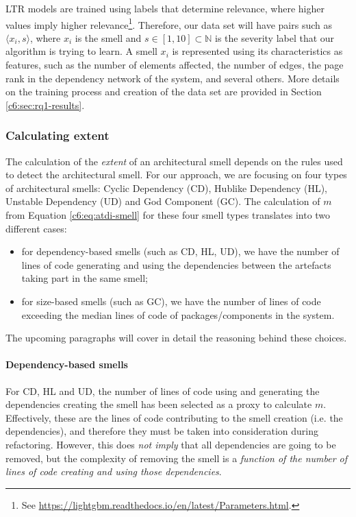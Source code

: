 LTR models are trained using labels that determine relevance, where higher values imply higher relevance\footnote{See \url{https://lightgbm.readthedocs.io/en/latest/Parameters.html}.}. 
Therefore, our data set will have pairs such as $\langle x_i, s \rangle$, where $x_i$ is the smell and $s\in [1, 10] \subset \mathbb{N}$ is the severity label that our algorithm is trying to learn.
A smell $x_i$ is represented using its characteristics as features, such as the number of elements affected, the number of edges, the page rank in the dependency network of the system, and several others. More details on the training process and creation of the data set are provided in Section \ref{c6:sec:rq1-results}.

\subsubsection{Calculating extent}\label{c6:sec:calculating-extent}
The calculation of the \emph{extent} of an architectural smell depends on the rules used to detect the architectural smell.
For our approach, we are focusing on four types of architectural smells: Cyclic Dependency (CD), Hublike Dependency (HL), Unstable Dependency (UD) and God Component (GC).
The calculation of $m$ from Equation \ref{c6:eq:atdi-smell} for these four smell types translates into two different cases:
\begin{itemize}
    \item for dependency-based smells (such as CD, HL, UD), we have the number of lines of code generating and using the dependencies between the artefacts taking part in the same smell;
    \item for size-based smells (such as GC), we have the number of lines of code exceeding the median lines of code of packages/components in the system.
\end{itemize}
The upcoming paragraphs will cover in detail the reasoning behind these choices.

\paragraph{Dependency-based smells}
For CD, HL and UD, the number of lines of code using and generating the dependencies creating the smell has been selected as a proxy to calculate $m$.
Effectively, these are the lines of code contributing to the smell creation (i.e. the dependencies), and therefore they must be taken into consideration during refactoring.
However, this does \emph{not imply} that all dependencies are going to be removed, but the complexity of removing the smell is a \emph{function of the number of lines of code creating and using those dependencies}.

